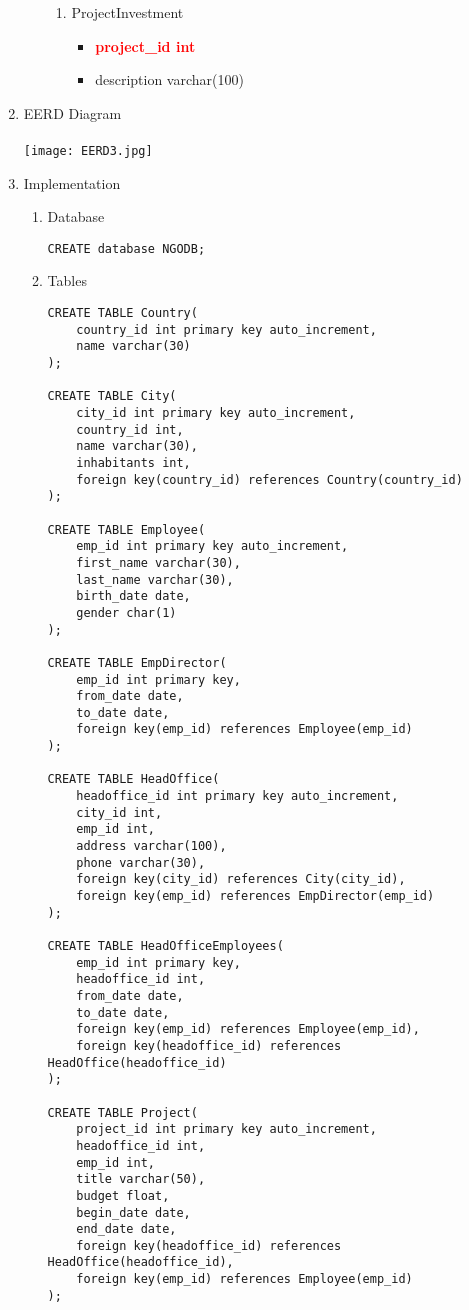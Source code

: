 \documentclass[]{article}
\begin{document}
\begin{enumerate}
\begin{enumerate}
\begin{enumerate}
\item ProjectInvestment
\begin{itemize}
\item \textcolor{red}{\textbf{project\_id int}}
\item description varchar(100)
\end{itemize}
\end{enumerate}

\end{enumerate}

\item EERD Diagram
\\\\
\texttt{[image: EERD3.jpg]}
\\
\item Implementation

\begin{enumerate}
\item Database
\begin{verbatim}
CREATE database NGODB;
\end{verbatim}

\item Tables
\begin{verbatim}
CREATE TABLE Country(
	country_id int primary key auto_increment,
	name varchar(30)
);

CREATE TABLE City(
	city_id int primary key auto_increment,
	country_id int,
	name varchar(30),
	inhabitants int,
	foreign key(country_id) references Country(country_id)
);

CREATE TABLE Employee(
	emp_id int primary key auto_increment,
	first_name varchar(30),
	last_name varchar(30),
	birth_date date,
	gender char(1)
);

CREATE TABLE EmpDirector(
	emp_id int primary key,
	from_date date,
	to_date date,
	foreign key(emp_id) references Employee(emp_id)
);

CREATE TABLE HeadOffice(
	headoffice_id int primary key auto_increment,
	city_id int,
	emp_id int,
	address varchar(100),
	phone varchar(30),
	foreign key(city_id) references City(city_id),
	foreign key(emp_id) references EmpDirector(emp_id)
);

CREATE TABLE HeadOfficeEmployees(
	emp_id int primary key,
	headoffice_id int,
	from_date date,
	to_date date,
	foreign key(emp_id) references Employee(emp_id),
	foreign key(headoffice_id) references HeadOffice(headoffice_id)
);

CREATE TABLE Project(
	project_id int primary key auto_increment,
	headoffice_id int,
	emp_id int,
	title varchar(50),
	budget float,
	begin_date date,
	end_date date,
	foreign key(headoffice_id) references HeadOffice(headoffice_id),
	foreign key(emp_id) references Employee(emp_id)
);


\end{verbatim}
\end{enumerate}
\end{enumerate}
\end{document}
